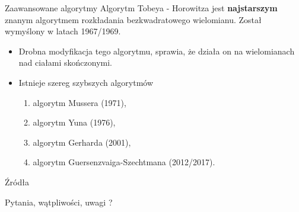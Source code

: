 \documentclass{beamer}
\newcommand{\NWD}{\rm{NWD}}
\renewcommand{\epsilon}{\bm{\varepsilon}}
\begin{document}

\begin{frame}{Zaawansowane algorytmy}
    Algorytm Tobeya - Horowitza jest \textbf{najstarszym} znanym algorytmem rozkładania bezkwadratowego wielomianu.
    Został wymyślony w latach 1967/1969. 
    \pause 
    \begin{itemize}
        \item Drobna modyfikacja tego algorytmu, sprawia, że działa on na wielomianach nad ciałami skończonymi. 
        \pause \item Istnieje szereg szybszych algorytmów \begin{enumerate}
            \item algorytm Mussera (1971),
            \item algorytm Yuna (1976),
            \item algorytm Gerharda (2001),
            \item algorytm Guersenzvaiga-Szechtmana (2012/2017).
        \end{enumerate}
    \end{itemize}
\end{frame}
\begin{frame}{Źródła}

\printbibliography
\end{frame}

\begin{frame}
    \centering 
    \LARGE Pytania, wątpliwości, uwagi ? 
\end{frame}
\end{document}

